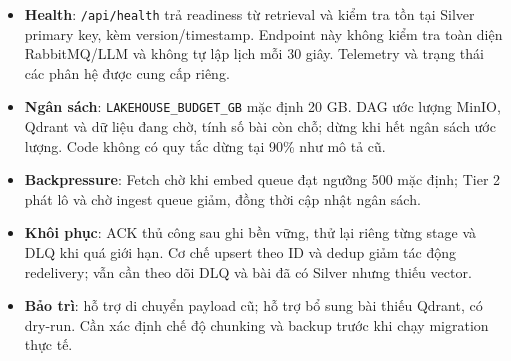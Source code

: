 \begin{itemize}
\item \textbf{Health}: \texttt{/api/health} trả readiness từ retrieval và kiểm tra tồn tại Silver primary key, kèm version/timestamp. Endpoint này không kiểm tra toàn diện RabbitMQ/LLM và không tự lập lịch mỗi 30 giây. Telemetry và trạng thái các phân hệ được cung cấp riêng.
\item \textbf{Ngân sách}: \texttt{LAKEHOUSE\_BUDGET\_GB} mặc định 20 GB. DAG ước lượng MinIO, Qdrant và dữ liệu đang chờ, tính số bài còn chỗ; dừng khi hết ngân sách ước lượng. Code không có quy tắc dừng tại 90\% như mô tả cũ.
\item \textbf{Backpressure}: Fetch chờ khi embed queue đạt ngưỡng 500 mặc định; Tier 2 phát lô và chờ ingest queue giảm, đồng thời cập nhật ngân sách.
\item \textbf{Khôi phục}: ACK thủ công sau ghi bền vững, thử lại riêng từng stage và DLQ khi quá giới hạn. Cơ chế upsert theo ID và dedup giảm tác động redelivery; vẫn cần theo dõi DLQ và bài đã có Silver nhưng thiếu vector.
\item \textbf{Bảo trì}:  hỗ trợ di chuyển payload cũ;  hỗ trợ bổ sung bài thiếu Qdrant, có dry-run. Cần xác định chế độ chunking và backup trước khi chạy migration thực tế.
\end{itemize}
